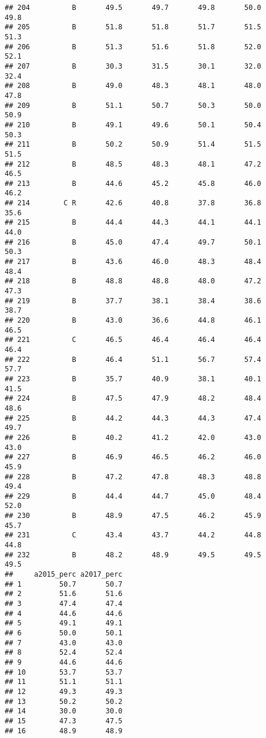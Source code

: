 \documentclass[]{article}
\begin{document}
\begin{verbatim}
## 204          B       49.5       49.7       49.8       50.0       49.8
## 205          B       51.8       51.8       51.7       51.5       51.3
## 206          B       51.3       51.6       51.8       52.0       52.1
## 207          B       30.3       31.5       30.1       32.0       32.4
## 208          B       49.0       48.3       48.1       48.0       47.8
## 209          B       51.1       50.7       50.3       50.0       50.9
## 210          B       49.1       49.6       50.1       50.4       50.3
## 211          B       50.2       50.9       51.4       51.5       51.5
## 212          B       48.5       48.3       48.1       47.2       46.5
## 213          B       44.6       45.2       45.8       46.0       46.2
## 214        C R       42.6       40.8       37.8       36.8       35.6
## 215          B       44.4       44.3       44.1       44.1       44.0
## 216          B       45.0       47.4       49.7       50.1       50.3
## 217          B       43.6       46.0       48.3       48.4       48.4
## 218          B       48.8       48.8       48.0       47.2       47.3
## 219          B       37.7       38.1       38.4       38.6       38.7
## 220          B       43.0       36.6       44.8       46.1       46.5
## 221          C       46.5       46.4       46.4       46.4       46.4
## 222          B       46.4       51.1       56.7       57.4       57.7
## 223          B       35.7       40.9       38.1       40.1       41.5
## 224          B       47.5       47.9       48.2       48.4       48.6
## 225          B       44.2       44.3       44.3       47.4       49.7
## 226          B       40.2       41.2       42.0       43.0       43.0
## 227          B       46.9       46.5       46.2       46.0       45.9
## 228          B       47.2       47.8       48.3       48.8       49.4
## 229          B       44.4       44.7       45.0       48.4       52.0
## 230          B       48.9       47.5       46.2       45.9       45.7
## 231          C       43.4       43.7       44.2       44.8       44.8
## 232          B       48.2       48.9       49.5       49.5       49.5
##     a2015_perc a2017_perc
## 1         50.7       50.7
## 2         51.6       51.6
## 3         47.4       47.4
## 4         44.6       44.6
## 5         49.1       49.1
## 6         50.0       50.1
## 7         43.0       43.0
## 8         52.4       52.4
## 9         44.6       44.6
## 10        53.7       53.7
## 11        51.1       51.1
## 12        49.3       49.3
## 13        50.2       50.2
## 14        30.0       30.0
## 15        47.3       47.5
## 16        48.9       48.9

\end{verbatim}
\end{document}

